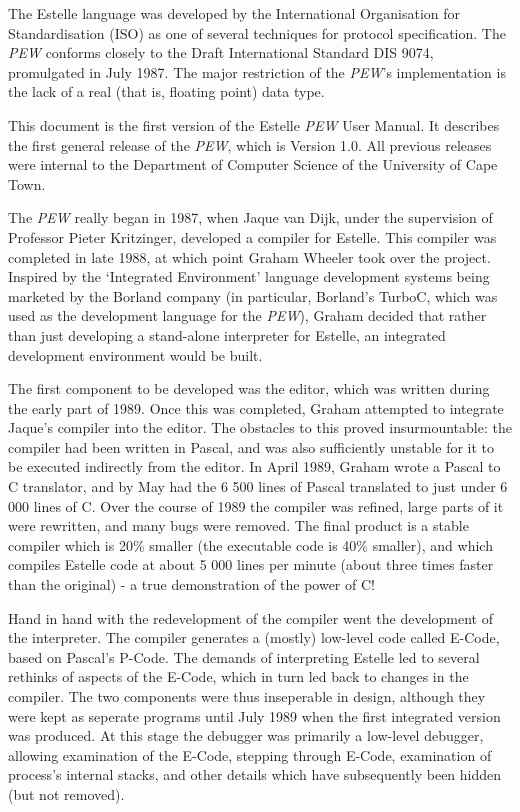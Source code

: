 The Estelle language was developed by the International Organisation
for Standardisation (ISO) as one of several techniques for protocol
specification. The {\em PEW} conforms closely to the Draft
International Standard DIS 9074, promulgated in July 1987. The major
restriction of the {\em PEW}'s implementation is the lack of a real
(that is, floating point) data type.

This document is the first version of the Estelle {\em PEW} User
Manual. It describes the first general release of the
{\em PEW}, which is Version 1.0. All previous releases were internal
to the Department of Computer Science of the University of Cape Town.

The {\em PEW} really began in 1987, when Jaque van Dijk, under the
supervision of Professor Pieter Kritzinger, developed a compiler for
Estelle. This compiler was completed in late 1988, at which
point Graham Wheeler took over the project. Inspired by the `Integrated
Environment' language development systems being marketed by the
Borland company (in particular, Borland's TurboC, which was used as
the development language for the {\em PEW}), Graham decided that
rather than just developing a stand-alone interpreter for Estelle, an
integrated development environment would be built.

The first component to be developed was the editor, which was written
during the early part of 1989. Once this was completed, Graham
attempted to integrate Jaque's compiler into the editor. The
obstacles to this proved insurmountable: the compiler had been
written in Pascal, and was also sufficiently unstable for it to be
executed indirectly from the editor. In April 1989, Graham wrote a
Pascal to C translator, and by May had the 6 500 lines of Pascal
translated to just under 6 000 lines of C. Over the course of 1989
the compiler was refined, large parts of it were rewritten, and many
bugs were removed. The final product is a stable compiler which is
20\% smaller (the executable code is 40\% smaller), and which compiles
Estelle code at about 5 000 lines per minute (about three times
faster than the original) - a true demonstration of the power of C!

Hand in hand with the redevelopment of the compiler went the
development of the interpreter. The compiler generates a (mostly)
low-level code called E-Code, based on Pascal's P-Code. The demands
of interpreting Estelle led to several rethinks of aspects of the
E-Code, which in turn led back to changes in the compiler. The two
components were thus inseperable in design, although they were kept
as seperate programs until July 1989 when the first integrated
version was produced. At this stage the debugger was primarily a
low-level debugger, allowing examination of the E-Code, stepping
through E-Code, examination of process's internal stacks, and other
details which have subsequently been hidden (but not removed).

